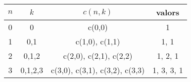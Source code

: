 \UseRawInputEncoding
\begin{tabular}{|c|c|c|c|}
\hline
$n$ & $k$ & $c(n,k)$ & valors\\
\hline
0 & 0 & c(0,0) & 1 \\
1 & 0,1 & c(1,0), c(1,1) & 1, 1 \\
2 & 0,1,2 & c(2,0), c(2,1), c(2,2) & 1, 2, 1 \\
3 & 0,1,2,3 & c(3,0), c(3,1), c(3,2), c(3,3) & 1, 3, 3, 1 \\
\hline
\end{tabular}
